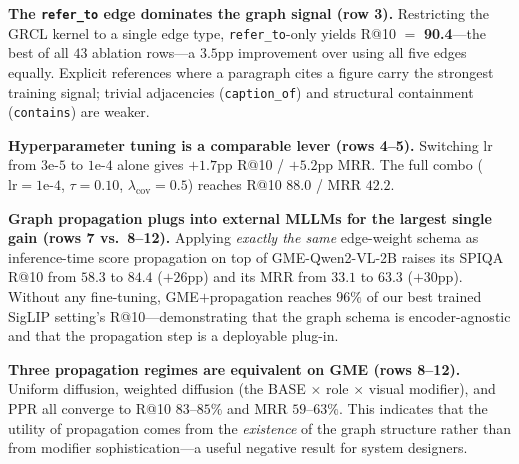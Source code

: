 \documentclass{article}
\begin{document}
\textbf{The \texttt{refer\_to} edge dominates the graph signal (row 3).}
Restricting the GRCL kernel to a single edge type, \texttt{refer\_to}-only
yields R@10 $=$ \textbf{90.4}---the best of all $43$ ablation rows---a
$3.5$pp improvement over using all five edges equally. Explicit references
where a paragraph cites a figure carry the strongest training signal;
trivial adjacencies (\texttt{caption\_of}) and structural containment
(\texttt{contains}) are weaker.

\textbf{Hyperparameter tuning is a comparable lever (rows 4--5).}
Switching $\text{lr}$ from $3\mathrm{e}\text{-}5$ to $1\mathrm{e}\text{-}4$
alone gives $+1.7$pp R@10 / $+5.2$pp MRR. The full combo
($\text{lr}\!=\!1\mathrm{e}\text{-}4$, $\tau\!=\!0.10$,
$\lambda_\text{cov}\!=\!0.5$) reaches R@10 $88.0$ / MRR $42.2$.

\textbf{Graph propagation plugs into external MLLMs for the largest single
gain (rows 7 vs.\ 8--12).} Applying \emph{exactly the same} edge-weight
schema as inference-time score propagation on top of GME-Qwen2-VL-2B raises
its SPIQA R@10 from $58.3$ to $84.4$ ($+26$pp) and its MRR from $33.1$ to
$63.3$ ($+30$pp). Without any fine-tuning, GME$+$propagation reaches $96\%$
of our best trained SigLIP setting's R@10---demonstrating that the graph
schema is encoder-agnostic and that the propagation step is a deployable
plug-in.

\textbf{Three propagation regimes are equivalent on GME (rows 8--12).}
Uniform diffusion, weighted diffusion (the BASE $\times$ role $\times$ visual
modifier), and PPR all converge to R@10 $83$--$85\%$ and MRR $59$--$63\%$.
This indicates that the utility of propagation comes from the
\emph{existence} of the graph structure rather than from modifier
sophistication---a useful negative result for system designers.
\end{document}
